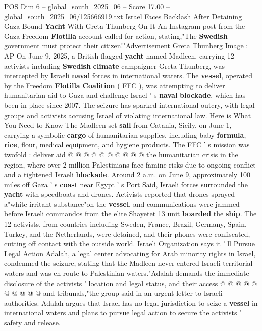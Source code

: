 \begin{textsample}{POS Dim 6 – global\_south\_2025\_06 – Score 17.00 – global\_south\_2025\_06/125666919.txt}  \label{ex:f6_pos_005}
Israel Faces Backlash After Detaining Gaza Bound \textbf{Yacht} With Greta Thunberg On It An Instagram post from the Gaza Freedom \textbf{Flotilla} account called for action, stating,"The \textbf{Swedish} government must protect their citizen!"Advertisement Greta Thunberg Image : AP On June 9, 2025, a British-flagged \textbf{yacht} named Madleen, carrying 12 activists including \textbf{Swedish} \textbf{climate} campaigner Greta Thunberg, was intercepted by Israeli \textbf{naval} forces in international waters.
The \textbf{vessel}, operated by the Freedom \textbf{Flotilla} \textbf{Coalition} ( FFC ), was attempting to deliver humanitarian aid to Gaza and challenge Israel ' s \textbf{naval} \textbf{blockade}, which has been in place since 2007.
The seizure has sparked international outcry, with legal groups and activists accusing Israel of violating international law.
Here is What You Need to Know The Madleen set \textbf{sail} from Catania, Sicily, on June 1, carrying a symbolic \textbf{cargo} of humanitarian supplies, including baby \textbf{formula}, \textbf{rice}, flour, medical equipment, and hygiene products.
The FFC ' s mission was twofold : deliver aid @ @ @ @ @ @ @ @ @ @ the humanitarian crisis in the region, where over 2 million Palestinians face famine risks due to ongoing conflict and a tightened Israeli \textbf{blockade}.
Around 2 a.m. on June 9, approximately 100 miles off Gaza ' s \textbf{coast} near Egypt ' s Port Said, Israeli forces surrounded the \textbf{yacht} with speedboats and drones.
Activists reported that drones sprayed a"white irritant substance"on the \textbf{vessel}, and communications were jammed before Israeli commandos from the elite Shayetet 13 unit \textbf{boarded} the \textbf{ship}.
The 12 activists, from countries including Sweden, France, Brazil, Germany, Spain, Turkey, and the Netherlands, were detained, and their phones were confiscated, cutting off contact with the outside world.
Israeli Organization says it ' ll Pursue Legal Action Adalah, a legal center advocating for Arab minority rights in Israel, condemned the seizure, stating that the Madleen never entered Israeli territorial waters and was en route to Palestinian waters."Adalah demands the immediate disclosure of the activists ' location and legal status, and their access @ @ @ @ @ @ @ @ @ @ and tribunals,"the group said in an urgent letter to Israeli authorities.
Adalah argues that Israel has no legal jurisdiction to seize a \textbf{vessel} in international waters and plans to pursue legal action to secure the activists ' safety and release.

\end{textsample}
